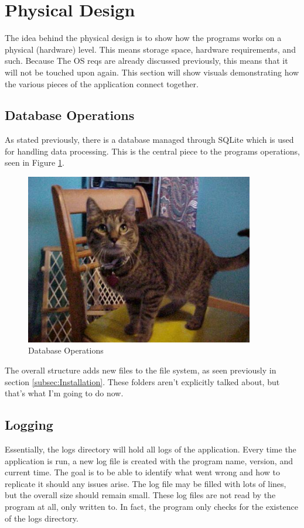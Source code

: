 \section{Physical Design}

The idea behind the physical design is to show how the programs works
on a physical (hardware) level. This means storage space, hardware
requirements, and such. Because The OS reqs are already discussed
previously, this means that it will not be touched upon again. This
section will show visuals demonstrating how the various pieces of the
application connect together.

\subsection{Database Operations}

As stated previously, there is a database managed through SQLite
which is used for handling data processing. This is the central piece
to the programs operations, seen in Figure \ref{fig:DBOperations}.

\begin{figure}[htb]
	\centering
	\includegraphics[width=10cm]{./Images/cats_00001.jpg}
	\caption{Database Operations}
	\label{fig:DBOperations}
\end{figure}

The overall structure adds new files to the file system, as seen
previously in section \ref{subsec:Installation}. These folders aren't
explicitly talked about, but that's what I'm going to do now.

\subsection{Logging}

Essentially, the logs directory will hold all logs of the
application. Every time the application is run, a new log file is
created with the program name, version, and current time. The goal is
to be able to identify what went wrong and how to replicate it should
any issues arise. The log file may be filled with lots of lines, but
the overall size should remain small. These log files are not read by
the program at all, only written to. In fact, the program only checks
for the existence of the logs directory.

